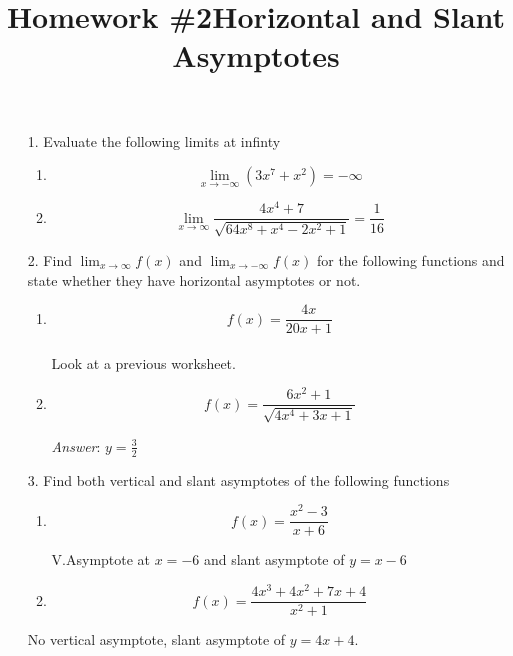 \documentclass[12pt,reqno]{article}
\title{Homework \#2}
\theoremstyle{definition}
\begin{document}
	\title{Horizontal and Slant Asymptotes}
	\date{ }
	\maketitle
	
	\begin{enumerate}
	\item[1.] Evaluate the following limits at infinty
	\begin{enumerate}
		\item $$\lim_{x\to -\infty} (3x^7 + x^2) = -\infty $$ 
		\item $$ \lim_{x \to \infty} \frac{4x^4 + 7}{\sqrt{64x^8 + x^4 - 2x^2 + 1}} = \frac{1}{16}$$
	\end{enumerate}
	\item[2.] Find $\lim_{x\to \infty} f(x)$ and $\lim_{x\to -\infty}f(x)$ for the following functions and state whether they have horizontal asymptotes or not.
	
	\begin{enumerate}
	
	\item $$f(x) = \frac{4x}{20x + 1}$$\\
	
	Look at a previous worksheet.
	
	
	
	\item $$f(x) = \frac{6x^2 + 1}{\sqrt{4x^4 + 3x + 1}}$$
	
	
	{\em Answer}:  $y = \frac{3}{2}$\\
	
	
	
	
	\end{enumerate}
	
	\item[3.]Find both vertical and slant asymptotes of the following functions
	\begin{enumerate}
		\item $$f(x) = \frac{x^2 - 3}{x + 6}$$ 
		
		V.Asymptote at $x = -6$ and slant asymptote of $y = x - 6$
		\item $$f(x) = \frac{4x^3 + 4  x^2 + 7x + 4}{x^2 + 1}$$ 
	\end{enumerate}

	No vertical asymptote, slant asymptote of $y = 4x + 4$. 
		
	\end{enumerate}
	
	
	
	
	
	
	
\end{document}
